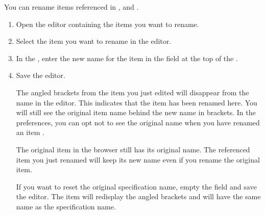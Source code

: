 
You can rename items referenced in \gdcases{}, \gdsuites{} and \gdjobs{}.

\begin{enumerate}
\item Open the editor containing the items you want to rename.
\item Select the item you want to rename in the editor.
\item In the \gdpropview{}, enter the new name for the item in the  field at the top of the \gdpropview{}. 
\item Save the editor.

The angled brackets from the item  you just edited will disappear from the name in the editor. This indicates that the item has been renamed here. You will still see the original item name behind the new name in brackets. In the preferences, you can opt not to see the original name when you have renamed an item . 

The original item in the browser still has its original name. The referenced item you just renamed will keep its new name even if you rename the original item. 

If you want to reset the original specification name,  empty the  field and save the editor. The item will redisplay the angled brackets and will have the same name as the specification name.
\end{enumerate}
